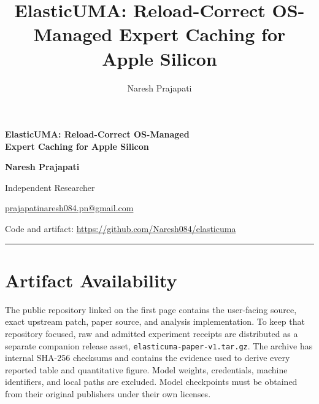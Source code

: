 \documentclass[10pt,letterpaper]{article}
\title{ElasticUMA: Reload-Correct OS-Managed Expert Caching for Apple Silicon}
\author{Naresh Prajapati}
\date{}
\newcommand{\code}[1]{\texttt{#1}}
\begin{document}
\thispagestyle{empty}

\begin{center}
  {\fontsize{18}{22}\selectfont\bfseries\color{navy}
  ElasticUMA: Reload-Correct OS-Managed\\[-1pt]
  Expert Caching for Apple Silicon\par}
  \vspace{0.65em}
  {\large\bfseries Naresh Prajapati\par}
  \vspace{0.18em}
  {\normalsize Independent Researcher\par}
  \vspace{0.12em}
  {\small\href{mailto:prajapatinaresh084.pn@gmail.com}{prajapatinaresh084.pn@gmail.com}\par}
  \vspace{0.4em}
  {\small Code and artifact: \url{https://github.com/Naresh084/elasticuma}\par}
\end{center}
\vspace{0.25em}
\noindent\color{rulegray}\rule{\linewidth}{0.7pt}\color{black}













\section*{Artifact Availability}
The public repository linked on the first page contains the user-facing source,
exact upstream patch, paper source, and analysis implementation. To keep that
repository focused, raw and admitted experiment receipts are distributed as a
separate companion release asset, \code{elasticuma-paper-v1.tar.gz}. The archive
has internal SHA-256 checksums and contains the evidence used to derive every
reported table and quantitative figure. Model weights, credentials, machine
identifiers, and local paths are excluded. Model checkpoints must be obtained
from their original publishers under their own licenses.
\end{document}
